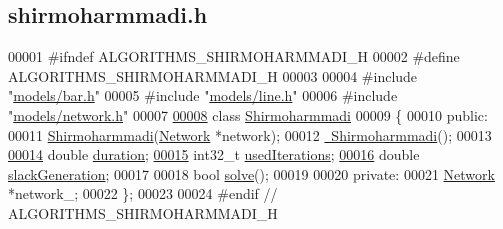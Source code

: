 \hypertarget{shirmoharmmadi_8h_source}{}\subsection{shirmoharmmadi.\+h}
\label{shirmoharmmadi_8h_source}

\begin{DoxyCode}
00001 \textcolor{preprocessor}{#ifndef ALGORITHMS\_SHIRMOHARMMADI\_H}
00002 \textcolor{preprocessor}{#define ALGORITHMS\_SHIRMOHARMMADI\_H}
00003 
00004 \textcolor{preprocessor}{#include "\hyperlink{bar_8h}{models/bar.h}"}
00005 \textcolor{preprocessor}{#include "\hyperlink{line_8h}{models/line.h}"}
00006 \textcolor{preprocessor}{#include "\hyperlink{network_8h}{models/network.h}"}
00007 
\hypertarget{shirmoharmmadi_8h_source_l00008}{}\hyperlink{class_shirmoharmmadi}{00008} \textcolor{keyword}{class }\hyperlink{class_shirmoharmmadi}{Shirmoharmmadi}
00009 \{
00010 \textcolor{keyword}{public}:
00011   \hyperlink{class_shirmoharmmadi_aa5833386f9b43019a318c81a3006e2b1}{Shirmoharmmadi}(\hyperlink{class_network}{Network} *network);
00012   \hyperlink{class_shirmoharmmadi_ac89016d70d3c99339af11f3b6f1f23b2}{~Shirmoharmmadi}();
00013 
\hypertarget{shirmoharmmadi_8h_source_l00014}{}\hyperlink{class_shirmoharmmadi_a32ab19ff485833106bf68cd91dbc94e6}{00014}   \textcolor{keywordtype}{double} \hyperlink{class_shirmoharmmadi_a32ab19ff485833106bf68cd91dbc94e6}{duration};
\hypertarget{shirmoharmmadi_8h_source_l00015}{}\hyperlink{class_shirmoharmmadi_afdd22da0145b033c47f4f8a6bbd37d0d}{00015}   int32\_t \hyperlink{class_shirmoharmmadi_afdd22da0145b033c47f4f8a6bbd37d0d}{usedIterations};
\hypertarget{shirmoharmmadi_8h_source_l00016}{}\hyperlink{class_shirmoharmmadi_aeb47da6439c2e92c7ebcc59ebb71624b}{00016}   \textcolor{keywordtype}{double} \hyperlink{class_shirmoharmmadi_aeb47da6439c2e92c7ebcc59ebb71624b}{slackGeneration};
00017 
00018   \textcolor{keywordtype}{bool} \hyperlink{class_shirmoharmmadi_acb4a06c62b5d97c25bea70acd477e715}{solve}();
00019 
00020 \textcolor{keyword}{private}:
00021   \hyperlink{class_network}{Network} *network\_;
00022 \};
00023 
00024 \textcolor{preprocessor}{#endif // ALGORITHMS\_SHIRMOHARMMADI\_H}
\end{DoxyCode}
